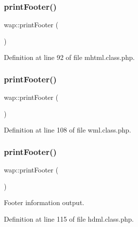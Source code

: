 \subsubsection{\texorpdfstring{print\+Footer()}{printFooter()}\hspace{0.1cm}{\footnotesize\ttfamily [1/3]}}
{\footnotesize\ttfamily wap\+::print\+Footer (\begin{DoxyParamCaption}{ }\end{DoxyParamCaption})}



Definition at line 92 of file mhtml.\+class.\+php.

\mbox{\label{classwap_a1fd1c1dca866c9b6653499cabf124980}} 
\subsubsection{\texorpdfstring{print\+Footer()}{printFooter()}\hspace{0.1cm}{\footnotesize\ttfamily [2/3]}}
{\footnotesize\ttfamily wap\+::print\+Footer (\begin{DoxyParamCaption}{ }\end{DoxyParamCaption})}



Definition at line 108 of file wml.\+class.\+php.

\mbox{\label{classwap_a1fd1c1dca866c9b6653499cabf124980}} 
\subsubsection{\texorpdfstring{print\+Footer()}{printFooter()}\hspace{0.1cm}{\footnotesize\ttfamily [3/3]}}
{\footnotesize\ttfamily wap\+::print\+Footer (\begin{DoxyParamCaption}{ }\end{DoxyParamCaption})}



Footer information output. 



Definition at line 115 of file hdml.\+class.\+php.

\mbox{\label{classwap_a402c6a180ae759c7a173a67441dfb716}} 

